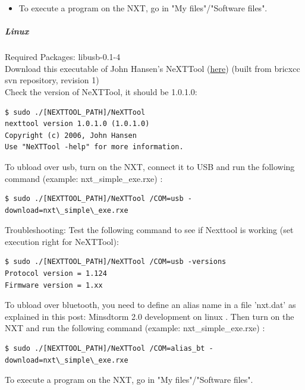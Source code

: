 \begin{itemize}
\begin{center}[h]
	\end{center}
\item To execute a program on the NXT, go in "My files"/"Software files".
\end{itemize}

\subparagraph{Linux}
Required Packages: libusb-0.1-4\\
Download this executable of John Hansen's NeXTTool (\href{http://lejos-osek.sourceforge.net/installation_linux_files/NeXTTool}{here}) (built from bricxcc svn repository, revision 1)\\
Check the version of NeXTTool, it should be 1.0.1.0:
\begin{verbatim}
$ sudo ./[NEXTTOOL_PATH]/NeXTTool
nexttool version 1.0.1.0 (1.0.1.0)
Copyright (c) 2006, John Hansen
Use "NeXTTool -help" for more information.
\end{verbatim}

To ubload over usb, turn on the NXT, connect it to USB and run the following command (example: nxt\_simple\_exe.rxe) :
\begin{verbatim}
$ sudo ./[NEXTTOOL_PATH]/NeXTTool /COM=usb -download=nxt\_simple\_exe.rxe
\end{verbatim}

Troubleshooting: Test the following command to see if Nexttool is working (set execution right for NeXTTool):
\begin{verbatim}
$ sudo ./[NEXTTOOL_PATH]/NeXTTool /COM=usb -versions
Protocol version = 1.124
Firmware version = 1.xx
\end{verbatim}

To ubload over bluetooth, you need to define an alias name in a file 'nxt.dat' as explained in this post: Minsdtorm 2.0 development on linux . Then turn on the NXT and run the following command (example: nxt\_simple\_exe.rxe) :
\begin{verbatim}
$ sudo ./[NEXTTOOL_PATH]/NeXTTool /COM=alias_bt -download=nxt\_simple\_exe.rxe
\end{verbatim}

To execute a program on the NXT, go in "My files"/"Software files".

